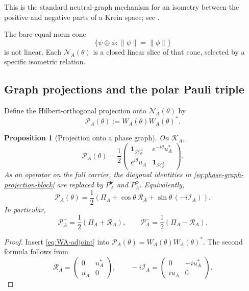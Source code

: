 \documentclass[11pt,reqno]{scrartcl}
\newcommand{\idop}{\mathbf 1}
\newcommand{\polA}{u_A}
\newcommand{\RA}{\mathcal R_{A}}
\newcommand{\IA}{\mathcal I_{A}}
\newcommand{\PiA}{\Pi_{A}}
\newcommand{\actHP}{\mathscr H_{\Psi}^{A}}
\newcommand{\actHF}{\mathscr H_{\Phi}^{A}}
\newcommand{\actK}{\mathscr K_{A}}
\newcommand{\suppProjP}{P_{A}^{\Psi}}
\newcommand{\suppProjF}{P_{A}^{\Phi}}
\newcommand{\NAtheta}{\mathscr N_{A}(\theta)}
\newcommand{\WAtheta}{W_{A}(\theta)}
\newcommand{\PAPlus}{\mathcal P_{A}^{+}}
\newcommand{\PAMinus}{\mathcal P_{A}^{-}}
\newcommand{\PAtheta}{\mathcal P_{A}(\theta)}
\theoremstyle{plain}
\newtheorem{proposition}[proposition]{Proposition}
\theoremstyle{definition}
\theoremstyle{remark}
\begin{document}
This is the standard neutral-graph mechanism for an isometry between the
positive and negative parts of a Krein space; see \cite{Bognar}.

The bare equal-norm cone
\begin{equation}
  \{\psi\oplus\phi:\|\psi\|=\|\phi\|\}
  \label{eq:bare-active-neutral-cone}
\end{equation}
is not linear.  Each \(\NAtheta\) is a closed linear slice of that cone,
selected by a specific isometric relation.

\subsection{Graph projections and the polar Pauli triple}

Define the Hilbert-orthogonal projection onto \(\NAtheta\) by
\begin{equation}
  \PAtheta:=\WAtheta\WAtheta^*.
  \label{eq:graph-projection-definition}
\end{equation}

\begin{proposition}[Projection onto a phase graph]
\label{prop:phase-graph-projection}
On \(\actK\),
\begin{equation}
  \boxed{
  \PAtheta
  =\frac12
   \begin{pmatrix}
     \idop_{\actHP}&e^{-i\theta}\polA^*\\
     e^{i\theta}\polA&\idop_{\actHF}
   \end{pmatrix}.}
  \label{eq:phase-graph-projection-block}
\end{equation}
As an operator on the full carrier, the diagonal identities in
\eqref{eq:phase-graph-projection-block} are replaced by
\(\suppProjP\) and \(\suppProjF\).  Equivalently,
\begin{equation}
  \boxed{
  \PAtheta
  =\frac12\left(
      \PiA+\cos\theta\,\RA+\sin\theta\,(-i\IA)
    \right).}
  \label{eq:phase-graph-projection-Pauli}
\end{equation}
In particular,
\begin{equation}
  \PAPlus=\frac12(\PiA+\RA),
  \qquad
  \PAMinus=\frac12(\PiA-\RA).
  \label{eq:aligned-anti-projections}
\end{equation}
\end{proposition}

\begin{proof}
Insert \eqref{eq:WA-adjoint} into
\(\PAtheta=\WAtheta\WAtheta^*\).  The second formula follows from
\begin{equation}
  \RA=
  \begin{pmatrix}0&\polA^*\\\polA&0\end{pmatrix},
  \qquad
  -i\IA=
  \begin{pmatrix}0&-i\polA^*\\i\polA&0\end{pmatrix}.
\end{equation}
\end{proof}
\end{document}
